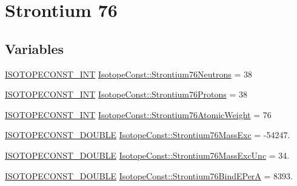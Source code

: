 \hypertarget{group___isotope_const-_strontium-_sr76}{}\section{Strontium 76}
\label{group___isotope_const-_strontium-_sr76}
\subsection*{Variables}
\begin{DoxyCompactItemize}
\item 
\mbox{\hyperlink{group___isotope_const-_macros_ga5f18360b3e99483a35c32d789e62621c}{I\+S\+O\+T\+O\+P\+E\+C\+O\+N\+S\+T\+\_\+\+I\+NT}} \mbox{\hyperlink{group___isotope_const-_strontium-_sr76_gafd0666c326b2393cd4fda59e8db8002f}{Isotope\+Const\+::\+Strontium76\+Neutrons}} = 38
\item 
\mbox{\hyperlink{group___isotope_const-_macros_ga5f18360b3e99483a35c32d789e62621c}{I\+S\+O\+T\+O\+P\+E\+C\+O\+N\+S\+T\+\_\+\+I\+NT}} \mbox{\hyperlink{group___isotope_const-_strontium-_sr76_gac5fcac0938b58fa366c4a2a82d13e251}{Isotope\+Const\+::\+Strontium76\+Protons}} = 38
\item 
\mbox{\hyperlink{group___isotope_const-_macros_ga5f18360b3e99483a35c32d789e62621c}{I\+S\+O\+T\+O\+P\+E\+C\+O\+N\+S\+T\+\_\+\+I\+NT}} \mbox{\hyperlink{group___isotope_const-_strontium-_sr76_ga64325edd5c81eb6ec8439e5f89a200fe}{Isotope\+Const\+::\+Strontium76\+Atomic\+Weight}} = 76
\item 
\mbox{\hyperlink{group___isotope_const-_macros_ga8f45a7272ce02c0b4c65c44636ed719a}{I\+S\+O\+T\+O\+P\+E\+C\+O\+N\+S\+T\+\_\+\+D\+O\+U\+B\+LE}} \mbox{\hyperlink{group___isotope_const-_strontium-_sr76_gab93797576a4c642109b5d51aa07d0232}{Isotope\+Const\+::\+Strontium76\+Mass\+Exc}} = -\/54247.
\item 
\mbox{\hyperlink{group___isotope_const-_macros_ga8f45a7272ce02c0b4c65c44636ed719a}{I\+S\+O\+T\+O\+P\+E\+C\+O\+N\+S\+T\+\_\+\+D\+O\+U\+B\+LE}} \mbox{\hyperlink{group___isotope_const-_strontium-_sr76_gaaa5f817335ed7c5b8432c1092ba0a649}{Isotope\+Const\+::\+Strontium76\+Mass\+Exc\+Unc}} = 34.
\item 
\mbox{\hyperlink{group___isotope_const-_macros_ga8f45a7272ce02c0b4c65c44636ed719a}{I\+S\+O\+T\+O\+P\+E\+C\+O\+N\+S\+T\+\_\+\+D\+O\+U\+B\+LE}} \mbox{\hyperlink{group___isotope_const-_strontium-_sr76_ga3fd026008b42d098c7028dc0bd17117d}{Isotope\+Const\+::\+Strontium76\+Bind\+E\+PerA}} = 8393.
\item 

\end{DoxyCompactItemize}
